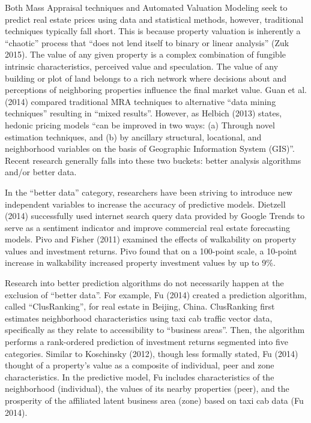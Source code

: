 \documentclass[12pt,]{article}
\begin{document}
Both Mass Appraisal techniques and Automated Valuation Modeling seek to
predict real estate prices using data and statistical methods, however,
traditional techniques typically fall short. This is because property
valuation is inherently a ``chaotic'' process that ``does not lend
itself to binary or linear analysis'' (Zuk 2015). The value of any given
property is a complex combination of fungible intrinsic characteristics,
perceived value and speculation. The value of any building or plot of
land belongs to a rich network where decisions about and perceptions of
neighboring properties influence the final market value. Guan et al.
(2014) compared traditional MRA techniques to alternative ``data mining
techniques'' resulting in ``mixed results''. However, as Helbich (2013)
states, hedonic pricing models ``can be improved in two ways: (a)
Through novel estimation techniques, and (b) by ancillary structural,
locational, and neighborhood variables on the basis of Geographic
Information System (GIS)''. Recent research generally falls into these
two buckets: better analysis algorithms and/or better data.

In the ``better data'' category, researchers have been striving to
introduce new independent variables to increase the accuracy of
predictive models. Dietzell (2014) successfully used internet search
query data provided by Google Trends to serve as a sentiment indicator
and improve commercial real estate forecasting models. Pivo and Fisher
(2011) examined the effects of walkability on property values and
investment returns. Pivo found that on a 100-point scale, a 10-point
increase in walkability increased property investment values by up to
9\%.

Research into better prediction algorithms do not necessarily happen at
the exclusion of ``better data''. For example, Fu (2014) created a
prediction algorithm, called ``ClusRanking'', for real estate in
Beijing, China. ClusRanking first estimates neighborhood characteristics
using taxi cab traffic vector data, specifically as they relate to
accessibility to ``business areas''. Then, the algorithm performs a
rank-ordered prediction of investment returns segmented into five
categories. Similar to Koschinsky (2012), though less formally stated,
Fu (2014) thought of a property's value as a composite of individual,
peer and zone characteristics. In the predictive model, Fu includes
characteristics of the neighborhood (individual), the values of its
nearby properties (peer), and the prosperity of the affiliated latent
business area (zone) based on taxi cab data (Fu 2014).
\end{document}
